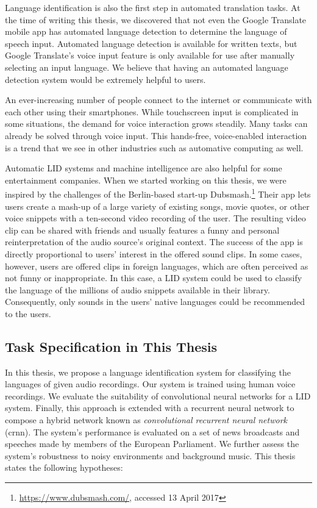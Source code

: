 Language identification is also the first step in automated translation tasks. At the time of writing this thesis, we discovered that not even the Google Translate mobile app has automated language detection to determine the language of speech input. Automated language detection is available for written texts, but Google Translate's voice input feature is only available for use after manually selecting an input language. We believe that having an automated language detection system would be extremely helpful to users.

An ever-increasing number of people connect to the internet or communicate with each other using their smartphones. While touchscreen input is complicated in some situations, the demand for voice interaction grows steadily. Many tasks can already be solved through voice input. This hands-free, voice-enabled interaction is a trend that we see in other industries such as automative computing as well.

Automatic LID systems and machine intelligence are also helpful for some entertainment companies. When we started working on this thesis, we were inspired by the challenges of the Berlin-based start-up Dubsmash.\footnote{\url{https://www.dubsmash.com/}, accessed 13 April 2017} Their app lets users create a mash-up of a large variety of existing songs, movie quotes, or other voice snippets with a ten-second video recording of the user. The resulting video clip can be shared with friends and usually features a funny and personal reinterpretation of the audio source's original context. The success of the app is directly proportional to users' interest in the offered sound clips. In some cases, however, users are offered clips in foreign languages, which are often perceived as not funny or inappropriate. In this case, a LID system could be used to classify the language of the millions of audio snippets available in their library. Consequently, only sounds in the users' native languages could be recommended to the users.


\subsection{Task Specification in This Thesis}
\label{sec:task-specification}
In this thesis, we propose a language identification system for classifying the languages of given audio recordings. Our system is trained using human voice recordings. We evaluate the suitability of convolutional neural networks for a LID system. Finally, this approach is extended with a recurrent neural network to compose a hybrid network known as \emph{convolutional recurrent neural network} (\ac{crnn}). The system's performance is evaluated on a set of news broadcasts and speeches made by members of the European Parliament. We further assess the system's robustness to noisy environments and background music. This thesis states the following hypotheses:

